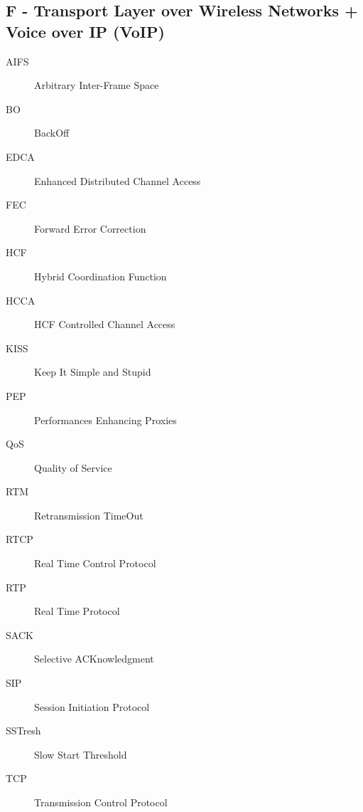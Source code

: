 \documentclass[twocolumn]{article}
\begin{document}
\begin{spacing}{0.5}
\section*{F - Transport Layer over Wireless Networks + Voice over IP (VoIP)}
\begin{description}
\item[AIFS]Arbitrary Inter-Frame Space
\item[BO]BackOff
\item[EDCA]Enhanced Distributed Channel Access
\item[FEC]Forward Error Correction
\item[HCF]Hybrid Coordination Function
\item[HCCA]HCF Controlled Channel Access
\item[KISS]Keep It Simple and Stupid
\item[PEP]Performances Enhancing Proxies
\item[QoS]Quality of Service
\item[RTM]Retransmission TimeOut
\item[RTCP]Real Time Control Protocol
\item[RTP]Real Time Protocol
\item[SACK]Selective ACKnowledgment 
\item[SIP]Session Initiation Protocol
\item[SSTresh]Slow Start Threshold
\item[TCP]Transmission Control Protocol
\end{description}


\end{spacing}
\end{document}

